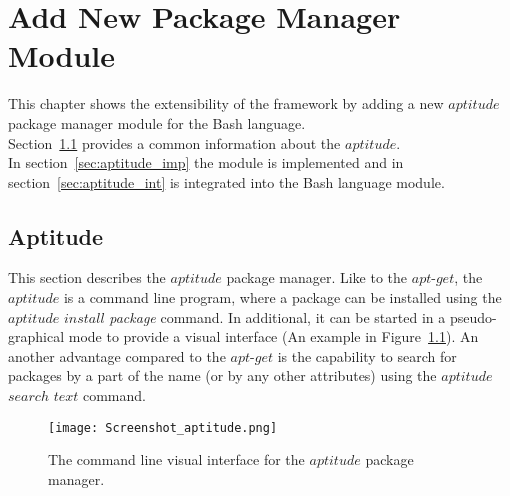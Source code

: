 
\chapter{Add New Package Manager Module}\label{chap:add}
This chapter shows the extensibility of the framework by adding a new $aptitude$ package manager module for the Bash language.\\
Section~\ref{sec:aptitude} provides a common information about the $aptitude$.\\
In section~\ref{sec:aptitude_imp} the module is implemented and in section~\ref{sec:aptitude_int} is integrated into the Bash language module.

\section{Aptitude}\label{sec:aptitude}
This section describes the $aptitude$ package manager.
Like to the $apt$-$get$, the $aptitude$ is a command line program, where a package can be installed using the $aptitude$ $install$ \emph{package} command. 
In additional, it can be started in a pseudo-graphical mode to provide a visual interface (An example in Figure~\ref{fig:aptitude_gui}).
An another advantage compared to the $apt$-$get$ is the capability to search for packages by a part of the name (or by any other attributes) using the $aptitude$ $search$ $text$ command.
\begin{figure}[ht]   
	\centering
	\texttt{[image: Screenshot\_aptitude.png]}
	\caption{The command line visual interface for the $aptitude$ package manager.}
	\label{fig:aptitude_gui}
\end{figure}

